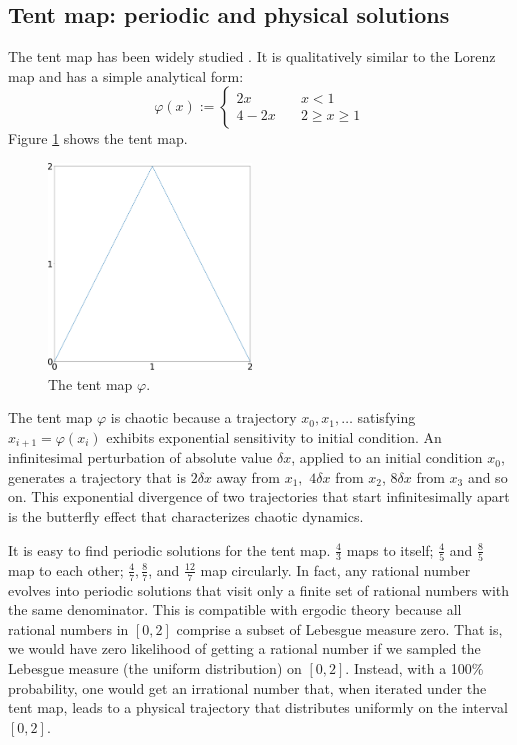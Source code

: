 \subsection{Tent map: periodic and physical solutions}
\label{sec:tent}
The tent map has been widely studied \cite{tent1}\cite{tent2}.  It is qualitatively similar
to the Lorenz map and has a simple analytical form:
\begin{equation} \label{tentmap}
    \varphi(x) := \begin{cases}
    2x \quad & x < 1 \\
    4 - 2x \quad & 2 \ge x \ge 1
    \end{cases}
\end{equation}
Figure \ref{fig:tent_map} shows the tent map.
\begin{figure}\centering
\includegraphics[width=0.48\textwidth]{tent_map.png}
\caption{The tent map $\varphi$.}
\label{fig:tent_map}
\end{figure}

The tent map $\varphi$ is chaotic because a trajectory $x_0,x_1,\ldots$ satisfying
$x_{i+1} = \varphi(x_i)$ exhibits exponential sensitivity to initial condition. An infinitesimal perturbation of absolute value $\delta x$, applied to an initial condition $x_0$, generates a trajectory that is $2 \delta x$ away from $x_1,$ $4 \delta x$ from $x_2$, $8 \delta x$ from $x_3$ and so on. This exponential divergence of two trajectories that start infinitesimally apart is the butterfly effect that characterizes
chaotic dynamics.

It is easy to find periodic solutions for the tent map.
$\frac43$ maps to itself; $\frac45$ and $\frac85$ map to each other;
$\frac47, \frac87$, and $\frac{12}7$ map circularly.  In fact, any rational number evolves into periodic solutions that visit
only a finite set of rational numbers with the same denominator.
This is compatible
with ergodic theory because all rational numbers in $[0,2]$ comprise a subset of Lebesgue measure zero. That is, we would have zero likelihood of getting a
rational number if we sampled the Lebesgue measure (the uniform distribution) on $[0,2]$.  Instead, with a 100\% probability, one would get an irrational number
that, when iterated under the tent map, leads to a physical trajectory that distributes uniformly on the interval $[0,2]$.

